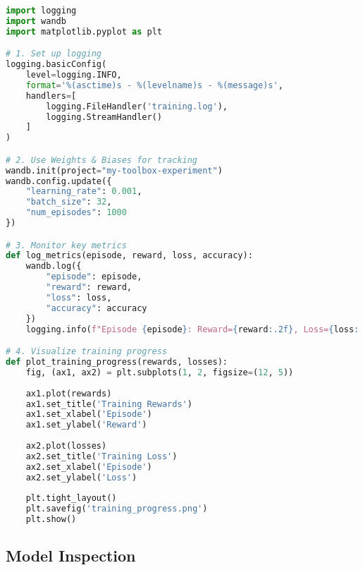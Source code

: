 \begin{lstlisting}[language=python, caption=Debugging Setup]
import logging
import wandb
import matplotlib.pyplot as plt

# 1. Set up logging
logging.basicConfig(
    level=logging.INFO,
    format='%(asctime)s - %(levelname)s - %(message)s',
    handlers=[
        logging.FileHandler('training.log'),
        logging.StreamHandler()
    ]
)

# 2. Use Weights & Biases for tracking
wandb.init(project="my-toolbox-experiment")
wandb.config.update({
    "learning_rate": 0.001,
    "batch_size": 32,
    "num_episodes": 1000
})

# 3. Monitor key metrics
def log_metrics(episode, reward, loss, accuracy):
    wandb.log({
        "episode": episode,
        "reward": reward,
        "loss": loss,
        "accuracy": accuracy
    })
    logging.info(f"Episode {episode}: Reward={reward:.2f}, Loss={loss:.4f}")

# 4. Visualize training progress
def plot_training_progress(rewards, losses):
    fig, (ax1, ax2) = plt.subplots(1, 2, figsize=(12, 5))
    
    ax1.plot(rewards)
    ax1.set_title('Training Rewards')
    ax1.set_xlabel('Episode')
    ax1.set_ylabel('Reward')
    
    ax2.plot(losses)
    ax2.set_title('Training Loss')
    ax2.set_xlabel('Episode')
    ax2.set_ylabel('Loss')
    
    plt.tight_layout()
    plt.savefig('training_progress.png')
    plt.show()
\end{lstlisting}

\subsection{Model Inspection}

